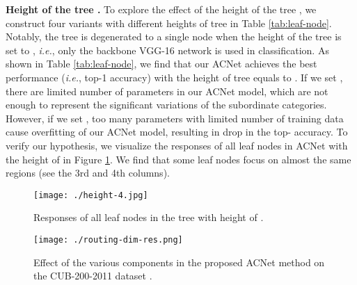 \documentclass[10pt,twocolumn,letterpaper]{article}
\def\ie{{\em i.e.}}
\begin{document}
{\flushleft \textbf{Height of the tree .}}
To explore the effect of the height of the tree , we construct four variants with different heights of tree in Table \ref{tab:leaf-node}. Notably, the tree  is degenerated to a single node when the height of the tree is set to , \ie, only the backbone VGG-16 network is used in classification.  As shown in Table \ref{tab:leaf-node}, we find that our ACNet achieves the best performance (\ie,  top-1 accuracy) with the height of tree equals to . If we set , there are limited number of parameters in our ACNet model, which are not enough to represent the significant variations of the subordinate categories. However, if we set , too many parameters with limited number of training data cause overfitting of our ACNet model, resulting in  drop in the top- accuracy. To verify our hypothesis, we visualize the responses of all leaf nodes in ACNet with the height of  in Figure \ref{fig:leaf-node}. We find that some leaf nodes focus on almost the same regions (see the 3rd and 4th columns).

\begin{figure}[h]
	\centering
	\texttt{[image: ./height-4.jpg]}
	\caption{Responses of all leaf nodes in the tree with height of .}
	\vspace{-2mm}
	\label{fig:leaf-node}
\end{figure}

\begin{figure}[t]
\centering
\texttt{[image: ./routing-dim-res.png]}
\caption{Effect of the various components in the proposed ACNet method on the CUB-200-2011 dataset \cite{report-wahcub_200_2011}.}
\vspace{-2mm}
\label{fig:ablation}
\end{figure}
\end{document}
